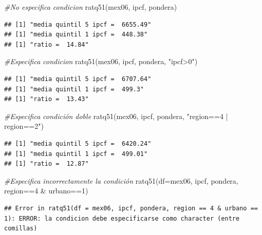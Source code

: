 \documentclass[
]{book}
\newenvironment{Shaded}{\begin{snugshade}}{\end{snugshade}}
\newcommand{\AttributeTok}[1]{\textcolor[rgb]{0.77,0.63,0.00}{#1}}
\newcommand{\CommentTok}[1]{\textcolor[rgb]{0.56,0.35,0.01}{\textit{#1}}}
\newcommand{\DecValTok}[1]{\textcolor[rgb]{0.00,0.00,0.81}{#1}}
\newcommand{\FunctionTok}[1]{\textcolor[rgb]{0.00,0.00,0.00}{#1}}
\newcommand{\NormalTok}[1]{#1}
\newcommand{\SpecialCharTok}[1]{\textcolor[rgb]{0.00,0.00,0.00}{#1}}
\newcommand{\StringTok}[1]{\textcolor[rgb]{0.31,0.60,0.02}{#1}}
\begin{document}
\begin{Shaded}
\begin{Highlighting}[]
\CommentTok{\#No especifica condicion}
\FunctionTok{ratq51}\NormalTok{(mex06, ipcf, pondera)  }
\end{Highlighting}
\end{Shaded}

\begin{verbatim}
## [1] "media quintil 5 ipcf =  6655.49"
## [1] "media quintil 1 ipcf =  448.38"
## [1] "ratio =  14.84"
\end{verbatim}

\begin{Shaded}
\begin{Highlighting}[]
\CommentTok{\#Especifica condicion}
\FunctionTok{ratq51}\NormalTok{(mex06, ipcf, pondera, }\StringTok{"ipcf\textgreater{}0"}\NormalTok{) }
\end{Highlighting}
\end{Shaded}

\begin{verbatim}
## [1] "media quintil 5 ipcf =  6707.64"
## [1] "media quintil 1 ipcf =  499.3"
## [1] "ratio =  13.43"
\end{verbatim}

\begin{Shaded}
\begin{Highlighting}[]
\CommentTok{\#Especifica condición doble}
\FunctionTok{ratq51}\NormalTok{(mex06, ipcf, pondera, }\StringTok{"region==4 | region==2"}\NormalTok{)  }
\end{Highlighting}
\end{Shaded}

\begin{verbatim}
## [1] "media quintil 5 ipcf =  6420.24"
## [1] "media quintil 1 ipcf =  499.01"
## [1] "ratio =  12.87"
\end{verbatim}

\begin{Shaded}
\begin{Highlighting}[]
\CommentTok{\#Especifica incorrectamente la condición}
\FunctionTok{ratq51}\NormalTok{(}\AttributeTok{df=}\NormalTok{mex06, ipcf, pondera, region}\SpecialCharTok{==}\DecValTok{4} \SpecialCharTok{\&}\NormalTok{ urbano}\SpecialCharTok{==}\DecValTok{1}\NormalTok{) }
\end{Highlighting}
\end{Shaded}

\begin{verbatim}
## Error in ratq51(df = mex06, ipcf, pondera, region == 4 & urbano == 1): ERROR: la condicion debe especificarse como character (entre comillas)
\end{verbatim}
\end{document}
